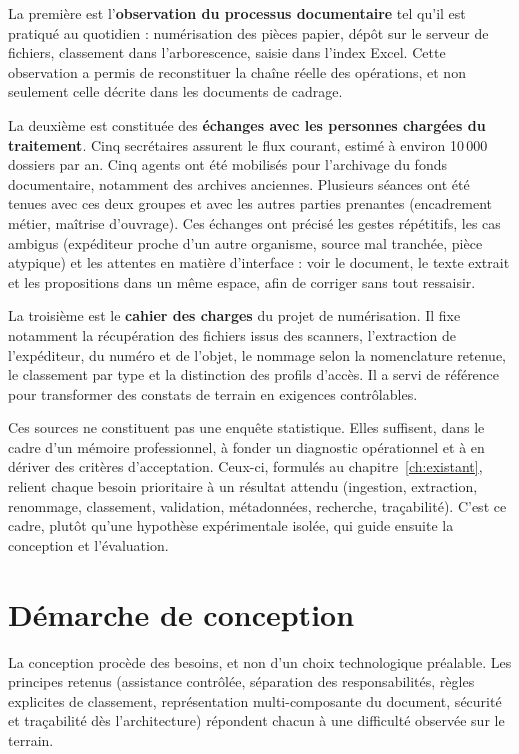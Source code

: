 La première est l'\textbf{observation du processus documentaire} tel qu'il est pratiqué au quotidien : numérisation des pièces papier, dépôt sur le serveur de fichiers, classement dans l'arborescence, saisie dans l'index Excel. Cette observation a permis de reconstituer la chaîne réelle des opérations, et non seulement celle décrite dans les documents de cadrage.

La deuxième est constituée des \textbf{échanges avec les personnes chargées du traitement}. Cinq secrétaires assurent le flux courant, estimé à environ 10\,000 dossiers par an. Cinq agents ont été mobilisés pour l'archivage du fonds documentaire, notamment des archives anciennes. Plusieurs séances ont été tenues avec ces deux groupes et avec les autres parties prenantes (encadrement métier, maîtrise d'ouvrage). Ces échanges ont précisé les gestes répétitifs, les cas ambigus (expéditeur proche d'un autre organisme, source mal tranchée, pièce atypique) et les attentes en matière d'interface : voir le document, le texte extrait et les propositions dans un même espace, afin de corriger sans tout ressaisir.

La troisième est le \textbf{cahier des charges} du projet de numérisation. Il fixe notamment la récupération des fichiers issus des scanners, l'extraction de l'expéditeur, du numéro et de l'objet, le nommage selon la nomenclature retenue, le classement par type et la distinction des profils d'accès. Il a servi de référence pour transformer des constats de terrain en exigences contrôlables.

Ces sources ne constituent pas une enquête statistique. Elles suffisent, dans le cadre d'un mémoire professionnel, à fonder un diagnostic opérationnel et à en dériver des critères d'acceptation. Ceux-ci, formulés au chapitre~\ref{ch:existant}, relient chaque besoin prioritaire à un résultat attendu (ingestion, extraction, renommage, classement, validation, métadonnées, recherche, traçabilité). C'est ce cadre, plutôt qu'une hypothèse expérimentale isolée, qui guide ensuite la conception et l'évaluation.

\section{Démarche de conception}

La conception procède des besoins, et non d'un choix technologique préalable. Les principes retenus (assistance contrôlée, séparation des responsabilités, règles explicites de classement, représentation multi-composante du document, sécurité et traçabilité dès l'architecture) répondent chacun à une difficulté observée sur le terrain.

